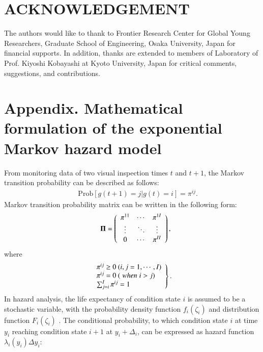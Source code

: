 \documentclass[a4paper,oneside,onecolumn,preprint,10pt,authoryear]{elsarticle}
\begin{document}
\section{ACKNOWLEDGEMENT}\label{sec8}
The authors would like to thank to Frontier Research Center for Global Young Researchers, Graduate School of Engineering, Osaka University, Japan for financial supports. In addition, thanks are extended to members of Laboratory of Prof. Kiyoshi Kobayashi at Kyoto University, Japan for critical comments, suggestions, and contributions.

\section{Appendix. Mathematical formulation of the exponential Markov hazard model}\label{sec8}
%
%
From monitoring data of two visual inspection times $t$ and $t+1$, the Markov transition probability can be described as follows:
%
\begin{eqnarray}
&& \mbox{Prob}[g(t+1)=j|g(t)=i]=\pi^{ij}.\label{pro}
\end{eqnarray}
Markov transition probability matrix can be written in the following form: 
\begin{eqnarray}
&& {\bf \Pi}=\left(
\begin{array}{ccc}
\pi^{11} & \cdots & \pi^{1I} \\
\vdots & \ddots & \vdots \\
0 & \cdots  & \pi^{II}
\end{array}
\right),\label{marko}
\end{eqnarray}
where
\begin{eqnarray}
\left.
\begin{array}{l}
\pi^{ij}\geq 0 ~(i,j=1,\cdots,I)\\
\pi^{ij}=0  ~(\hspace{1mm} when \hspace{1mm} i > j) \\
\sum_{j=i}^I \pi^{ij}=1 \\
\end{array}
\right\}.\label{suii}
\end{eqnarray}
In hazard analysis, the life expectancy of condition state $i$ is assumed to be a stochastic variable, with the probability density function $f_i(\zeta_i)$ and distribution function $F_i(\zeta_i)$ \citep{lancaster90,gouri}. The conditional probability, to which condition state $i$ at time $y_i$ reaching condition state $i+1$ at $y_i+\Delta_i$, can be expressed as hazard function $\lambda_i(y_i)\Delta{y_i}$:
\end{document}
